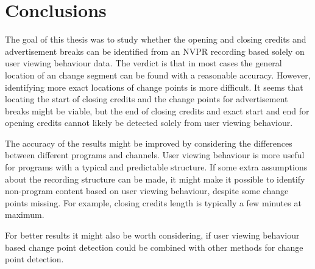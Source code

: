 

\section{Conclusions} \label{sec:conclusions} %

The goal of this thesis was to study whether the opening and closing credits and advertisement breaks can be identified from an NVPR recording based solely on user viewing behaviour data. The verdict is that in most cases the general location of an change segment can be found with a reasonable accuracy. However, identifying more exact locations of change points is more difficult. It seems that locating the start of closing credits and the change points for advertisement breaks might be viable, but the end of closing credits and exact start and end for opening credits cannot likely be detected solely from user viewing behaviour.

The accuracy of the results might be improved by considering the differences between different programs and channels. User viewing behaviour is more useful for programs with a typical and predictable structure. If some extra assumptions about the recording structure can be made, it might make it possible to identify non-program content based on user viewing behaviour, despite some change points missing. For example, closing credits length is typically a few minutes at maximum.

For better results it might also be worth considering, if user viewing behaviour based change point detection could be combined with other methods for change point detection. %


